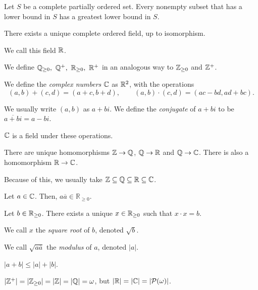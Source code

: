  \begin{prop}
    Let $S$ be a complete partially ordered set. Every nonempty subset that
    has a lower bound in $S$ has a greatest lower bound in $S$.
  \end{prop}
  \begin{thm}
    There exists a unique complete ordered field, up to isomorphism.
  \end{thm}
  \begin{defn}
    We call this field $\mathbb{R}$.
  \end{defn}
  \begin{defn}
    We define $\mathbb{Q}_{\ge 0},\ \mathbb{Q}^+,\ \mathbb{R}_{\ge 0},\ \mathbb{R}^+$ in an analogous way to
    $\mathbb{Z}_{\ge 0}$ and $\mathbb{Z}^+$.
  \end{defn}
  \begin{defn}
    We define the \emph{complex numbers} $\mathbb{C}$ as $\mathbb{R}^2$, with the operations
    \[(a,b)+(c,d)=(a+c,b+d),\qquad (a,b)\cdot(c,d)=(ac-bd,ad+bc).\]

    We usually write $(a,b)$ as $a+bi$. We define the \emph{conjugate} of $a+bi$
    to be $\overline{a+bi}=a-bi$.
  \end{defn}
  \begin{prop}
    $\mathbb{C}$ is a field under these operations.
  \end{prop}
  \begin{prop}
    There are unique homomorphisms $\mathbb{Z}\to\mathbb{Q}$, $\mathbb{Q}\to\mathbb{R}$ and $\mathbb{Q}\to\mathbb{C}$.
    There is also a homomorphism $\mathbb{R}\to\mathbb{C}$.
  \end{prop}
  \begin{rem}
    Because of this, we usually take $\mathbb{Z}\subseteq\mathbb{Q}\subseteq\mathbb{R}\subseteq\mathbb{C}$.
  \end{rem}
  \begin{prop}
    Let $a\in\mathbb{C}$. Then, $a\overline{a}\in\mathbb R_{\ge 0}$.
  \end{prop}
  \begin{prop}
    Let $b\in\mathbb{R}_{\ge 0}$. There exists a unique $x\in\mathbb{R}_{\ge 0}$ such that
    $x\cdot x=b$. 
  \end{prop}
  \begin{defn}
    We call $x$ the \emph{square root} of $b$, denoted $\sqrt b$.

    We call $\sqrt{a\overline a}$ the \emph{modulus} of $a$, denoted $|a|$.
  \end{defn}
  \begin{prop}
    $|a+b|\le|a|+|b|$.
  \end{prop}
  \begin{thm}
    $|\mathbb{Z}^+|=|\mathbb{Z}_{\ge 0}|=|\mathbb{Z}|=|\mathbb{Q}|=\omega$, but $|\mathbb{R}|=|\mathbb{C}|=|\mathcal
    P(\omega)|$.
  \end{thm}
